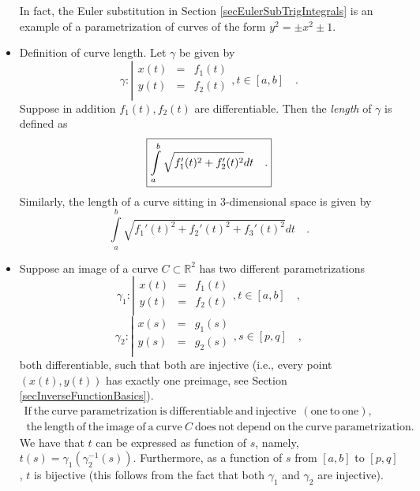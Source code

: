 \documentclass[12pt]{book}
\newcommand{\importantFormula}[1]{\begin{equation} \boxed{#1} \end{equation}}
\begin{document}
\begin{itemize}
In fact, the Euler substitution in Section \ref{secEulerSubTrigIntegrals} is an example of a parametrization of curves of the form $y^2=\pm x^2\pm 1$.
\item {}Definition of curve length. Let $\gamma$ be given by
\[
\gamma:\left| 
\begin{array}{rcl}
x(t)&=&f_1(t)\\
y(t)&=&f_2(t)\\
\end{array}\right., t\in [a,b]\quad .
\]
Suppose in addition $f_1(t), f_2(t)$ are differentiable. Then the \emph{length} of $\gamma$ is defined as 
\importantFormula{
\label{eqDefLengthCurve}
\int\limits_{a}^b \sqrt{f_1'(t)^2+f_2'(t)^2}dt \quad . 
}
Similarly, the length of a curve sitting in 3-dimensional space is given by 
\[
\int\limits_{a}^b \sqrt{f_1'(t)^2+f_2'(t)^2+f_3'(t)^2}dt \quad . 
\] 
\item Suppose an image of a curve $C\subset \mathbb R^2$ has two different parametrizations 
\begin{equation}\label{eqDefCurve1}
\gamma_1:\left| 
\begin{array}{rcl}
x(t)&=&f_1(t)\\
y(t)&=&f_2(t)\\
\end{array}\right., t\in [a,b]\quad ,
\end{equation}
\begin{equation}\label{eqDefCurve2}
\gamma_2:\left| 
\begin{array}{rcl}
x(s)&=&g_1(s)\\
y(s)&=&g_2(s)\\
\end{array}\right. , s\in [p,q]\quad ,
\end{equation}
both differentiable, such that both are injective (i.e., every point $(x(t), y(t))$ has exactly one preimage, see Section \ref{secInverseFunctionBasics}). 
\importantFormula{
\begin{array}{c}
\mathrm{If~the~curve~parametrization~is~differentiable~and~injective~~(one~to~one),}\\
\mathrm{~the~length~of~the~image~of~a~curve~}C
\mathrm{~does~not~depend~on~the~curve~parametrization.}
\end{array}
}
We have that $t$ can be expressed as function of $s$, namely, $t(s)= \gamma_1(\gamma_2^{-1}(s))$. Furthermore, as a function of $s$ from $[a,b]$ to $[p,q]$, $t$ is bijective (this follows from the fact that both $\gamma_1$ and $\gamma_2$ are injective).


\end{itemize}
\end{document}
